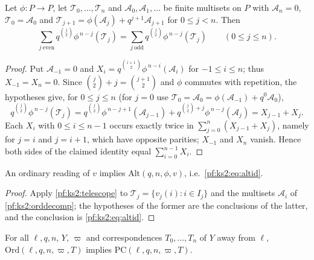 \begin{lemma}[Telescoping]\label{pf:ks2:telescope}
Let $\phi\colon P\to P$, let $\mathcal T_0,\dots,\mathcal T_n$ and $\mathcal A_0,\mathcal A_1,\dots$ be
finite multisets on $P$ with $\mathcal A_n=0$, $\mathcal T_0=\mathcal A_0$ and $\mathcal
T_{j+1}=\phi(\mathcal A_j)+q^{j+1}\mathcal A_{j+1}$ for $0\le j<n$. Then
\[
\sum_{j\ \mathrm{even}}q^{\binom j2}\phi^{\,n-j}(\mathcal T_j)=\sum_{j\ \mathrm{odd}}q^{\binom
j2}\phi^{\,n-j}(\mathcal T_j)\qquad(0\le j\le n).
\]
\end{lemma}

\begin{proof}
Put $\mathcal A_{-1}=0$ and $X_i=q^{\binom{i+1}2}\phi^{\,n-i}(\mathcal A_i)$ for $-1\le i\le n$; thus
$X_{-1}=X_n=0$. Since $\binom j2+j=\binom{j+1}2$ and $\phi$ commutes with repetition, the hypotheses
give, for $0\le j\le n$ (for $j=0$ use $\mathcal T_0=\mathcal A_0=\phi(\mathcal A_{-1})+q^0\mathcal
A_0$),
\[
q^{\binom j2}\phi^{\,n-j}(\mathcal T_j)=q^{\binom j2}\phi^{\,n-j+1}(\mathcal A_{j-1})+q^{\binom
j2+j}\phi^{\,n-j}(\mathcal A_j)=X_{j-1}+X_j .
\]
Each $X_i$ with $0\le i\le n-1$ occurs exactly twice in $\sum_{j=0}^n(X_{j-1}+X_j)$, namely for $j=i$
and $j=i+1$, which have opposite parities; $X_{-1}$ and $X_n$ vanish. Hence both sides of the
claimed identity equal $\sum_{i=0}^{n-1}X_i$.
\end{proof}

\begin{proposition}\label{pf:ks2:ordcount}
An ordinary reading of $v$ implies $\mathrm{Alt}(q,n,\phi,v)$, i.e.\ \eqref{pf:ks2:eq:altid}.
\end{proposition}

\begin{proof}
Apply \cref{pf:ks2:telescope} to $\mathcal T_j=\{v_j(i):i\in I_j\}$ and the multisets $\mathcal A_i$
of \cref{pf:ks2:orddecomp}; the hypotheses of the former are the conclusions of the latter, and the
conclusion is \eqref{pf:ks2:eq:altid}.
\end{proof}

\begin{corollary}\label{pf:ks2:ptidoford}
For all $\ell,q,n$, $Y$, $\varpi$ and correspondences $T_0,\dots,T_n$ of $Y$ away from $\ell$,
$\mathrm{Ord}(\ell,q,n,\varpi,T)$ implies $\mathrm{PC}(\ell,q,n,\varpi,T)$.
\end{corollary}

